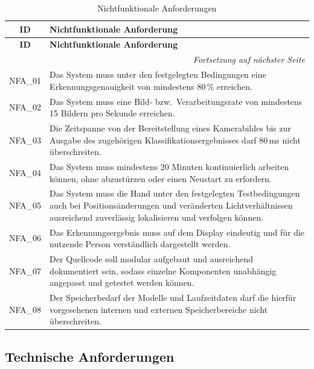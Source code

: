 \begin{longtable}{|c|p{}|}
    \caption{Nichtfunktionale Anforderungen}
    \label{tab:nichtfunktionale-anforderungen} \\
    \hline
    \textbf{ID} & \textbf{Nichtfunktionale Anforderung} \\
    \hline
    \endfirsthead
    \hline
    \textbf{ID} & \textbf{Nichtfunktionale Anforderung} \\
    \hline
    \endhead
    \hline
    \multicolumn{2}{r}{\textit{Fortsetzung auf nächster Seite}} \\
    \endfoot
    \hline
    \endlastfoot
    NFA\_01 & Das System muss unter den festgelegten Bedingungen eine Erkennungsgenauigkeit von mindestens 80\,\% erreichen. \\
    \hline
    NFA\_02 & Das System muss eine Bild- bzw.\ Verarbeitungsrate von mindestens 15 Bildern pro Sekunde erreichen. \\
    \hline
    NFA\_03 & Die Zeitspanne von der Bereitstellung eines Kamerabildes bis zur Ausgabe des zugehörigen Klassifikationsergebnisses darf 80\,ms nicht überschreiten. \\
    \hline
    NFA\_04 & Das System muss mindestens 20 Minuten kontinuierlich arbeiten können, ohne abzustürzen oder einen Neustart zu erfordern. \\
    \hline
    NFA\_05 & Das System muss die Hand unter den festgelegten Testbedingungen auch bei Positionsänderungen und veränderten Lichtverhältnissen ausreichend zuverlässig lokalisieren und verfolgen können. \\
    \hline
    NFA\_06 & Das Erkennungsergebnis muss auf dem Display eindeutig und für die nutzende Person verständlich dargestellt werden. \\
    \hline
    NFA\_07 & Der Quellcode soll modular aufgebaut und ausreichend dokumentiert sein, sodass einzelne Komponenten unabhängig angepasst und getestet werden können. \\
    \hline
    NFA\_08 & Der Speicherbedarf der Modelle und Laufzeitdaten darf die hierfür vorgesehenen internen und externen Speicherbereiche nicht überschreiten. \\
    \hline
\end{longtable}

\subsection{Technische Anforderungen}

